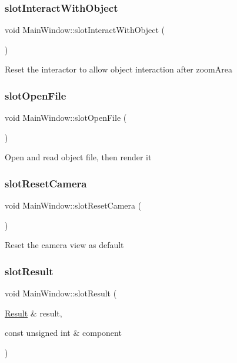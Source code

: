 \subsubsection{\texorpdfstring{slot\+Interact\+With\+Object}{slotInteractWithObject}}
{\footnotesize\ttfamily void Main\+Window\+::slot\+Interact\+With\+Object (\begin{DoxyParamCaption}{ }\end{DoxyParamCaption})\hspace{0.3cm}{\ttfamily [slot]}}

Reset the interactor to allow object interaction after zoom\+Area \mbox{\label{classMainWindow_a2ef511727fce3fc9bdf17a73f078cec7}} 
\subsubsection{\texorpdfstring{slot\+Open\+File}{slotOpenFile}}
{\footnotesize\ttfamily void Main\+Window\+::slot\+Open\+File (\begin{DoxyParamCaption}{ }\end{DoxyParamCaption})\hspace{0.3cm}{\ttfamily [slot]}}

Open and read object file, then render it \mbox{\label{classMainWindow_a73d6c706bae3e712ab654a78d1921c89}} 
\subsubsection{\texorpdfstring{slot\+Reset\+Camera}{slotResetCamera}}
{\footnotesize\ttfamily void Main\+Window\+::slot\+Reset\+Camera (\begin{DoxyParamCaption}{ }\end{DoxyParamCaption})\hspace{0.3cm}{\ttfamily [slot]}}

Reset the camera view as default \mbox{\label{classMainWindow_a914c794d921ccfcd861284bc8cd9f96a}} 
\subsubsection{\texorpdfstring{slot\+Result}{slotResult}}
{\footnotesize\ttfamily void Main\+Window\+::slot\+Result (\begin{DoxyParamCaption}\item[{\hyperlink{classResult}{Result} \&}]{result,  }\item[{const unsigned int \&}]{component }\end{DoxyParamCaption})\hspace{0.3cm}{\ttfamily [slot]}}

